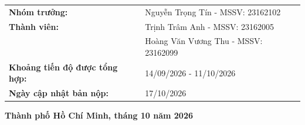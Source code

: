 \documentclass[12pt,a4paper,oneside]{report}
\begin{document}
\begin{titlepage}
\begin{center}
{\begin{tabularx}{0.86\textwidth}{L{6.0cm}Y}
    \textbf{Nhóm trưởng:} & Nguyễn Trọng Tín - MSSV: 23162102 \\
    \textbf{Thành viên:} & Trịnh Trâm Anh - MSSV: 23162005 \\
    & Hoàng Văn Vương Thu - MSSV: 23162099 \\
    \textbf{Khoảng tiến độ được tổng hợp:} & 14/09/2026 - 11/10/2026 \\
    \textbf{Ngày cập nhật bản nộp:} & 17/10/2026 \\
  \end{tabularx}}
\end{center}
\vfill
\begin{center}{\bfseries Thành phố Hồ Chí Minh, tháng 10 năm 2026}\end{center}
\end{titlepage}
\end{document}
